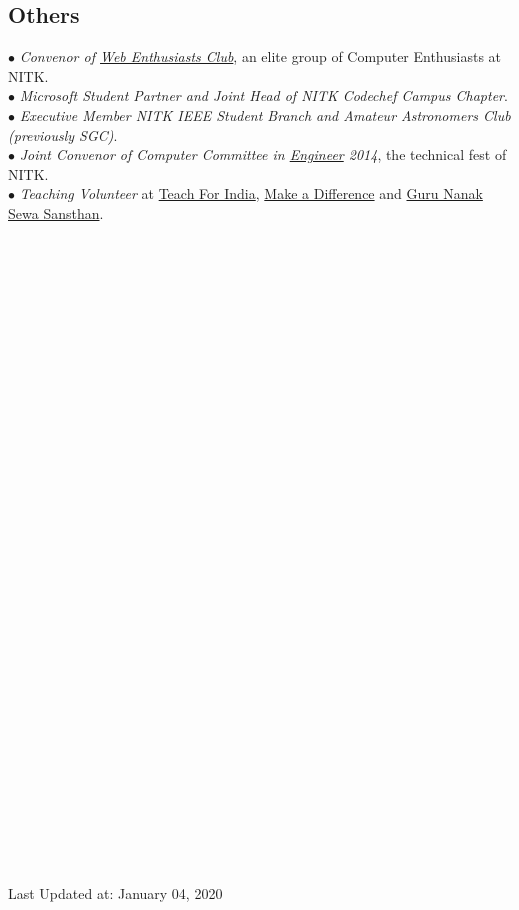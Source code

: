 \documentclass[margin,line]{resume}
\begin{document}
\begin{resume}
    \section{\mysidestyle \bf Others}
 $\bullet$ {\it Convenor of \href{https://webclub-nitk.github.io/}{Web Enthusiasts Club}}, an elite group of Computer Enthusiasts at NITK. \\
 $\bullet$ {\it Microsoft Student Partner and Joint Head of NITK Codechef Campus Chapter}. \\
     $\bullet$ {\it Executive Member NITK IEEE Student Branch and Amateur Astronomers Club (previously SGC)}. \\
     $\bullet$ {\it Joint Convenor of Computer Committee in \href{http://www.nitk.ac.in/students-activities/engineer}{Engineer} 2014}, the technical fest of NITK. \\
$\bullet$ {\it Teaching Volunteer} at \href{http://www.teachforindia.org/}{Teach For India}, \href{http://makeadiff.in/}{Make a Difference} and \href{https://www.nanakg.org/}{Guru Nanak Sewa Sansthan}.
    \\\\\\\\\\\\\\\\\\\\\\\\\\\\\\\\\\\\\\\\\\\\\\\\\\\\\\\\\\\\\\\\\\\\
\begin{footnotesize}
Last Updated at: January 04, 2020
\end{footnotesize}
\end{resume}
\end{document}
